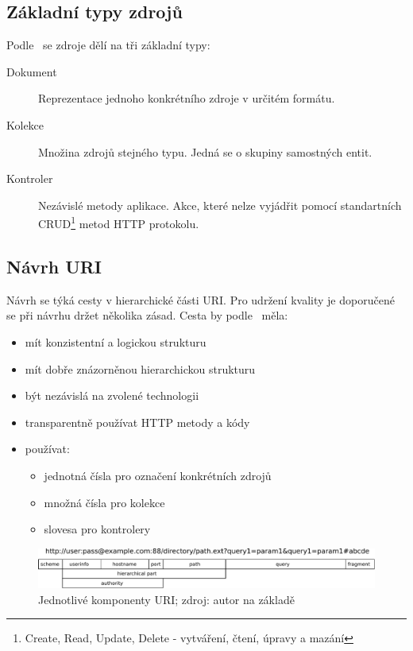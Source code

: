 \subsection{Základní typy zdrojů}

Podle~\cite{rest_vse} se zdroje dělí na tři základní typy:

\begin{description}
  \item[Dokument] Reprezentace jednoho konkrétního zdroje v určitém formátu.
  \item[Kolekce] Množina zdrojů stejného typu. Jedná se o skupiny samostných entit.
  \item[Kontroler] Nezávislé metody aplikace. Akce, které nelze vyjádřit pomocí standartních
  CRUD\footnote{Create, Read, Update, Delete - vytváření, čtení, úpravy a mazání} metod HTTP protokolu.
\end{description}

\subsection{Návrh URI}

Návrh se týká cesty v hierarchické části URI. Pro udržení kvality je doporučené se při návrhu držet několika zásad. Cesta by podle~\cite{rest_vse} měla:
    
\begin{itemize}
\item mít konzistentní a logickou strukturu
\item mít dobře znázorněnou hierarchickou strukturu
\item být nezávislá na zvolené technologii
\item transparentně používat HTTP metody a kódy
\item používat:
\begin{itemize}
\item jednotná čísla pro označení konkrétních zdrojů
\item množná čísla pro kolekce
\item slovesa pro kontrolery
\end{itemize}
\end{itemize}

\begin{figure}[ht!]
  \centering
  \includegraphics[width=130mm]{./images/uri.pdf}
  \caption{Jednotlivé komponenty URI; zdroj: autor na základě~\cite{uri}\label{overflow}}
\end{figure}

